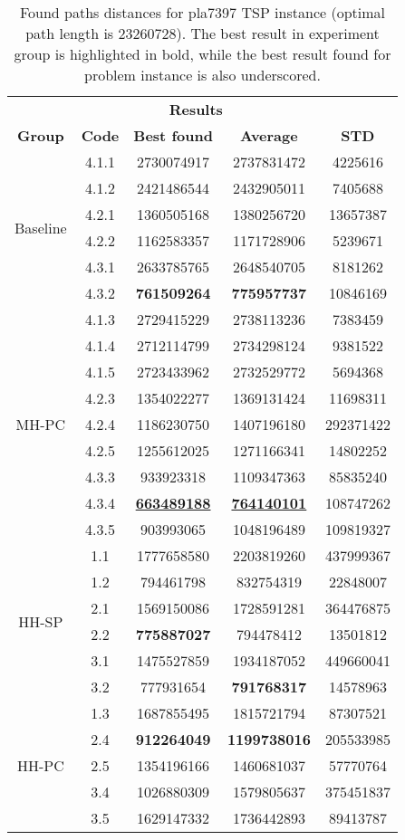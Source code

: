 \begin{table}[!htbp]
	\begin{tabular}{cc|ccc}
		\hline
		\rowcolor{gray!20}
		\multicolumn{2}{c|}{\textbf{Solver}} & \multicolumn{3}{c}{\textbf{Results}} \\
		\rowcolor{gray!20}
		\textbf{Group} & \textbf{Code} & \textbf{Best found} & \textbf{Average} & \textbf{STD} \\
		\hline		
		\multirow{6}{*}{Baseline} 
		& 4.1.1 & 2730074917 & 2737831472 & 4225616 \\
		& 4.1.2 & 2421486544 & 2432905011 & 7405688 \\
		& 4.2.1 & 1360505168 & 1380256720 & 13657387 \\
		& 4.2.2 & 1162583357 & 1171728906 & 5239671 \\
		& 4.3.1 & 2633785765 & 2648540705 & 8181262 \\
		& 4.3.2 & \textbf{761509264} & \textbf{775957737} & 10846169 \\
		\hline
		\multirow{9}{*}{MH-PC} 
		& 4.1.3 & 2729415229 & 2738113236 & 7383459 \\
		& 4.1.4 & 2712114799 & 2734298124 & 9381522 \\
		& 4.1.5 & 2723433962 & 2732529772 & 5694368 \\
		& 4.2.3 & 1354022277 & 1369131424 & 11698311 \\
		& 4.2.4 & 1186230750 & 1407196180 & 292371422 \\
		& 4.2.5 & 1255612025 & 1271166341 & 14802252 \\
		& 4.3.3 & 933923318 & 1109347363 & 85835240 \\
		& 4.3.4 & \textbf{\underline{663489188}} & \textbf{\underline{764140101}} & 108747262 \\
		& 4.3.5 & 903993065 & 1048196489 & 109819327 \\
		\hline
		\multirow{6}{*}{HH-SP} 
		& 1.1 & 1777658580 & 2203819260 & 437999367 \\
		& 1.2 & 794461798 & 832754319 & 22848007 \\
		& 2.1 & 1569150086 & 1728591281 & 364476875 \\
		& 2.2 & \textbf{775887027} & 794478412 & 13501812 \\
		& 3.1 & 1475527859 & 1934187052 & 449660041 \\
		& 3.2 & 777931654 & \textbf{791768317} & 14578963 \\
		\hline
		\multirow{5}{*}{HH-PC} 
		& 1.3 & 1687855495 & 1815721794 & 87307521 \\
		& 2.4 & \textbf{912264049} & \textbf{1199738016} & 205533985 \\
		& 2.5 & 1354196166 & 1460681037 & 57770764 \\
		& 3.4 & 1026880309 & 1579805637 & 375451837 \\
		& 3.5 & 1629147332 & 1736442893 & 89413787 \\
		\hline		
	\end{tabular}
	\caption{Found paths distances for pla7397 TSP instance (optimal path length is 23260728). The best result in experiment group is highlighted in bold, while the best result found for problem instance is also underscored.}
\end{table}